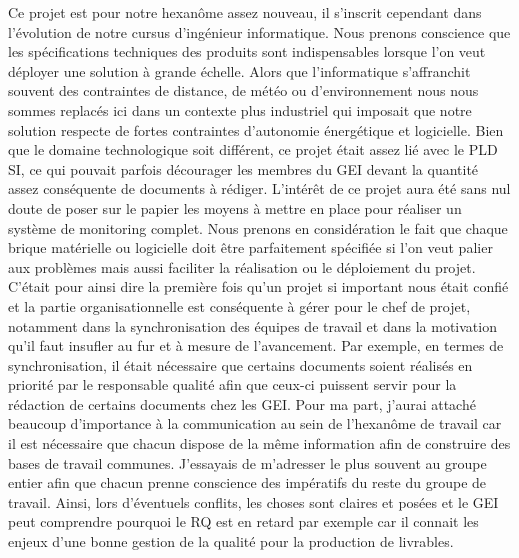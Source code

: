 Ce projet est pour notre hexanôme assez nouveau, il s'inscrit cependant dans l'évolution de notre cursus d'ingénieur informatique. Nous prenons conscience que les spécifications techniques des produits sont indispensables lorsque l'on veut déployer une solution à grande échelle. Alors que l'informatique s'affranchit souvent des contraintes de distance, de météo ou d'environnement nous nous sommes replacés ici dans un contexte plus industriel qui imposait que notre solution respecte de fortes contraintes d'autonomie énergétique et logicielle. Bien que le domaine technologique soit différent, ce projet était assez lié avec le PLD SI, ce qui pouvait parfois décourager les membres du GEI devant la quantité assez conséquente de documents à rédiger. L'intérêt de ce projet aura été sans nul doute de poser sur le papier les moyens à mettre en place pour réaliser un système de monitoring complet. Nous prenons en considération le fait que chaque brique matérielle ou logicielle doit être parfaitement spécifiée si l'on veut palier aux problèmes mais aussi faciliter la réalisation ou le déploiement du projet. C'était pour ainsi dire la première fois qu'un projet si important nous était confié et la partie organisationnelle est conséquente à gérer pour le chef de projet, notamment dans la synchronisation des équipes de travail et dans la motivation qu'il faut insufler au fur et à mesure de l'avancement. Par exemple, en termes de synchronisation, il était nécessaire que certains documents soient réalisés en priorité par le responsable qualité afin que ceux-ci puissent servir pour la rédaction de certains documents chez les GEI. Pour ma part, j'aurai attaché beaucoup d'importance à la communication au sein de l'hexanôme de travail car il est nécessaire que chacun dispose de la même information afin de construire des bases de travail communes. J'essayais de m'adresser le plus souvent au groupe entier afin que chacun prenne conscience des impératifs du reste du groupe de travail. Ainsi, lors d'éventuels conflits, les choses sont claires et posées et le GEI peut comprendre pourquoi le RQ est en retard par exemple car il connait les enjeux d'une bonne gestion de la qualité pour la production de livrables.
\medskip
\medskip
